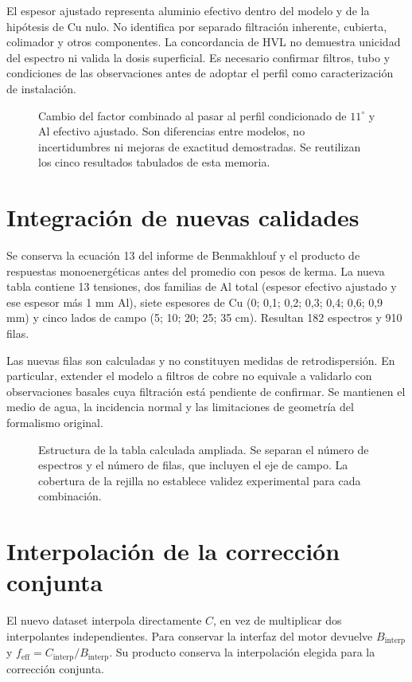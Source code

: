 

El espesor ajustado representa aluminio efectivo dentro del modelo y de la hipótesis de Cu nulo. No identifica por separado filtración inherente, cubierta, colimador y otros componentes. La concordancia de HVL no demuestra unicidad del espectro ni valida la dosis superficial. Es necesario confirmar filtros, tubo y condiciones de las observaciones antes de adoptar el perfil como caracterización de instalación.



\begin{figure}[htbp]\centering
\caption{Cambio del factor combinado al pasar al perfil condicionado de $11^\circ$ y Al efectivo ajustado. Son diferencias entre modelos, no incertidumbres ni mejoras de exactitud demostradas. Se reutilizan los cinco resultados tabulados de esta memoria.}\label{fig:impacto_factores}\end{figure}

\section{Integración de nuevas calidades}
Se conserva la ecuación 13 del informe de Benmakhlouf y el producto de respuestas monoenergéticas antes del promedio con pesos de kerma. La nueva tabla contiene 13 tensiones, dos familias de Al total (espesor efectivo ajustado y ese espesor más 1 mm Al), siete espesores de Cu (0; 0,1; 0,2; 0,3; 0,4; 0,6; 0,9 mm) y cinco lados de campo (5; 10; 20; 25; 35 cm). Resultan 182 espectros y 910 filas.

Las nuevas filas son calculadas y no constituyen medidas de retrodispersión. En particular, extender el modelo a filtros de cobre no equivale a validarlo con observaciones basales cuya filtración está pendiente de confirmar. Se mantienen el medio de agua, la incidencia normal y las limitaciones de geometría del formalismo original.



\begin{figure}[htbp]\centering
\caption{Estructura de la tabla calculada ampliada. Se separan el número de espectros y el número de filas, que incluyen el eje de campo. La cobertura de la rejilla no establece validez experimental para cada combinación.}\label{fig:malla_dataset}\end{figure}

\section{Interpolación de la corrección conjunta}
El nuevo dataset interpola directamente $C$, en vez de multiplicar dos interpolantes independientes. Para conservar la interfaz del motor devuelve $B_{\mathrm{interp}}$ y $f_{\mathrm{eff}}=C_{\mathrm{interp}}/B_{\mathrm{interp}}$. Su producto conserva la interpolación elegida para la corrección conjunta.

